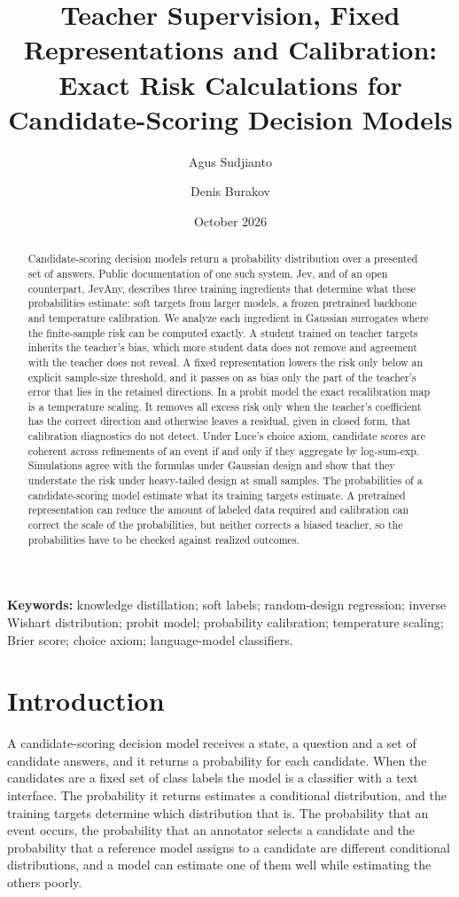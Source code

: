 \documentclass[11pt]{article}
\title{Teacher Supervision, Fixed Representations and Calibration:\\
Exact Risk Calculations for Candidate-Scoring Decision Models}
\author{Agus Sudjianto \and Denis Burakov}
\date{October 2026}
\theoremstyle{remark}
\newcommand{\1}{\mathbf 1}
\begin{document}
\maketitle

\begin{abstract}
Candidate-scoring decision models return a probability distribution over a presented set of answers. Public documentation of one such system, Jev, and of an open counterpart, JevAny, describes three training ingredients that determine what these probabilities estimate: soft targets from larger models, a frozen pretrained backbone and temperature calibration. We analyze each ingredient in Gaussian surrogates where the finite-sample risk can be computed exactly. A student trained on teacher targets inherits the teacher's bias, which more student data does not remove and agreement with the teacher does not reveal. A fixed representation lowers the risk only below an explicit sample-size threshold, and it passes on as bias only the part of the teacher's error that lies in the retained directions. In a probit model the exact recalibration map is a temperature scaling. It removes all excess risk only when the teacher's coefficient has the correct direction and otherwise leaves a residual, given in closed form, that calibration diagnostics do not detect. Under Luce's choice axiom, candidate scores are coherent across refinements of an event if and only if they aggregate by log-sum-exp. Simulations agree with the formulas under Gaussian design and show that they understate the risk under heavy-tailed design at small samples. The probabilities of a candidate-scoring model estimate what its training targets estimate. A pretrained representation can reduce the amount of labeled data required and calibration can correct the scale of the probabilities, but neither corrects a biased teacher, so the probabilities have to be checked against realized outcomes.
\end{abstract}

\noindent\textbf{Keywords:} knowledge distillation; soft labels; random-design regression; inverse Wishart distribution; probit model; probability calibration; temperature scaling; Brier score; choice axiom; language-model classifiers.

\section{Introduction}\label{sec:intro}
A candidate-scoring decision model receives a state, a question and a set of candidate answers, and it returns a probability for each candidate. When the candidates are a fixed set of class labels the model is a classifier with a text interface. The probability it returns estimates a conditional distribution, and the training targets determine which distribution that is. The probability that an event occurs, the probability that an annotator selects a candidate and the probability that a reference model assigns to a candidate are different conditional distributions, and a model can estimate one of them well while estimating the others poorly.
\end{document}
